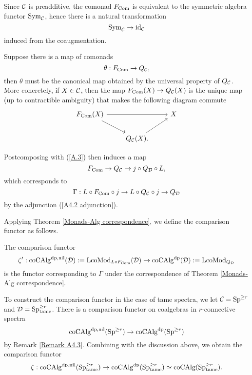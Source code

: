Since ${\mathcal{C}}$ is preadditive, the comonad $F_{\operatorname{Com}}$ is equivalent to the symmetric algebra functor $\operatorname{Sym}_{{\mathcal{C}}}$, hence there is a natural transformation
$$
\operatorname{Sym}_{{\mathcal{C}}} \to \operatorname{id}_{{\mathcal{C}}}
$$
induced from the coaugmentation.

\begin{remark}
\label{F_Com to Q_C}
Suppose there is a map of comonads
$$
\theta: F_{\operatorname{Com}} \to 
Q_{{\mathcal{C}}},
$$
then $\theta$ must be the canonical map obtained by the universal property of $Q_{{\mathcal{C}}}$.
    More concretely, if $X\in {\mathcal{C}}$, then the map $F_{\operatorname{Com}}(X) \to 
Q_{{\mathcal{C}}}(X)$ is the unique map (up to contractible ambiguity) that makes the following diagram commute
\[
\begin{tikzcd}
	 F_{\Com}(X) &   & X \\
	& Q_{\CC}(X) .  &
	\arrow[from=1-1, to = 1-3]
	\arrow[from=1-1 , to =2-2]
	\arrow[from=2-2, to=1-3]
\end{tikzcd}
\]
\end{remark}


Postcomposing with (\ref{A.3}) then induces a map 
$$
F_{\operatorname{Com}}  \to 
Q_{{\mathcal{C}}}
\to 
j\circ Q_{{\mathcal{D}}} \circ L,
$$
which corresponds to 
$$
\Gamma: L\circ F_{\operatorname{Com}} \circ j \to L\circ Q_{{\mathcal{C}}} \circ j \to Q_{{\mathcal{D}}}
$$
by the adjunction (\ref{A4.2 adjunction}).

Applying Theorem \ref{Monads-Alg correspondence}, we define the comparison functor as follows.
\begin{definition}
    The comparison functor
    \[
    \zeta': \operatorname{coCAlg}^{\operatorname{dp},\operatorname{nil}}({\mathcal{D}}) :=\operatorname{LcoMod}_{L\circ F_{\operatorname{Com}}}({\mathcal{D}}) \to \operatorname{coCAlg}^{\operatorname{dp}}({\mathcal{D}}):=\operatorname{LcoMod}_{Q_{{\mathcal{D}}}}
    \]
    is the functor corresponding to $\Gamma$ under the correspondence of Theorem \ref{Monads-Alg correspondence}.
\end{definition}

To construct the comparison functor in the case of tame spectra, we let ${\mathcal{C}}=\operatorname{Sp}^{\geq r}$ and ${\mathcal{D}}=\operatorname{Sp}^{\geq r}_{\operatorname{\operatorname{tame}}}$. There is a comparison functor on coalgebras in $r$-connective spectra
$$
\operatorname{coCAlg}^{\operatorname{dp}, \operatorname{nil}}(\operatorname{Sp}^{\geq r}) \to  \operatorname{coCAlg}^{\operatorname{dp}}(\operatorname{Sp}^{\geq r})
$$
by Remark \ref{Remark A4.3}.
Combining with the discussion above, we obtain the comparison functor
\[
\zeta:\operatorname{coCAlg}^{\operatorname{dp},\operatorname{nil}}(\operatorname{Sp}^{\geq r}_{\operatorname{\operatorname{tame}}}) \to
\operatorname{coCAlg}^{\operatorname{dp}}(\operatorname{Sp}^{\geq r}_{\operatorname{\operatorname{tame}}})\simeq
\operatorname{coCAlg}(\operatorname{Sp}^{\geq r}_{\operatorname{\operatorname{tame}}}).
\]








